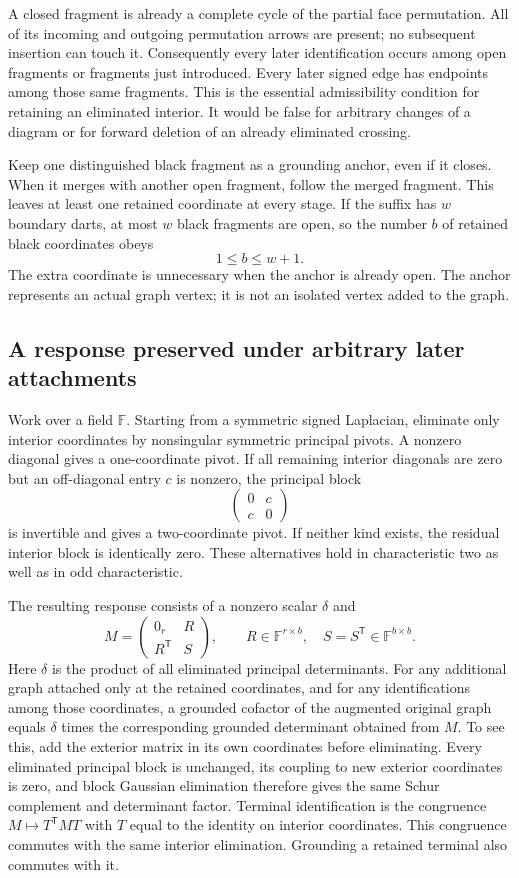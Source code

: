 A closed fragment is already a complete cycle of the partial face
permutation.  All of its incoming and outgoing permutation arrows are
present; no subsequent insertion can touch it.  Consequently every later
identification occurs among open fragments or fragments just introduced.
Every later signed edge has endpoints among those same fragments.  This
is the essential admissibility condition for retaining an eliminated
interior.  It would be false for arbitrary changes of a diagram or for
forward deletion of an already eliminated crossing.

Keep one distinguished black fragment as a grounding anchor, even if it
closes.  When it merges with another open fragment, follow the merged
fragment.  This leaves at least one retained coordinate at every stage.
If the suffix has $w$ boundary darts, at most $w$ black fragments are open,
so the number $b$ of retained black coordinates obeys
\[
                         1\le b\le w+1.
\]
The extra coordinate is unnecessary when the anchor is already open.
The anchor represents an actual graph vertex; it is not an isolated
vertex added to the graph.

\subsection{A response preserved under arbitrary later attachments}

Work over a field $\mathbb F$.  Starting from a symmetric signed
Laplacian, eliminate only interior coordinates by nonsingular symmetric
principal pivots.  A nonzero diagonal gives a one-coordinate pivot.
If all remaining interior diagonals are zero but an off-diagonal entry
$c$ is nonzero, the principal block
\[
             \begin{pmatrix}0&c\\c&0\end{pmatrix}
\]
is invertible and gives a two-coordinate pivot.  If neither kind exists,
the residual interior block is identically zero.  These alternatives
hold in characteristic two as well as in odd characteristic.

The resulting response consists of a nonzero scalar $\delta$ and
\[
 M=\begin{pmatrix}0_r&R\\R^{\mathsf T}&S\end{pmatrix},
 \qquad R\in\mathbb F^{r\times b},
 \quad S=S^{\mathsf T}\in\mathbb F^{b\times b}.
\]
Here $\delta$ is the product of all eliminated principal determinants.
For any additional graph attached only at the retained coordinates,
and for any identifications among those coordinates, a grounded cofactor
of the augmented original graph equals $\delta$ times the corresponding
grounded determinant obtained from $M$.  To see this, add the exterior
matrix in its own coordinates before eliminating.  Every eliminated
principal block is unchanged, its coupling to new exterior coordinates
is zero, and block Gaussian elimination therefore gives the same Schur
complement and determinant factor.  Terminal identification is the
congruence $M\mapsto T^{\mathsf T}MT$ with $T$ equal to the identity on
interior coordinates.  This congruence commutes with the same interior
elimination.  Grounding a retained terminal also commutes with it.

